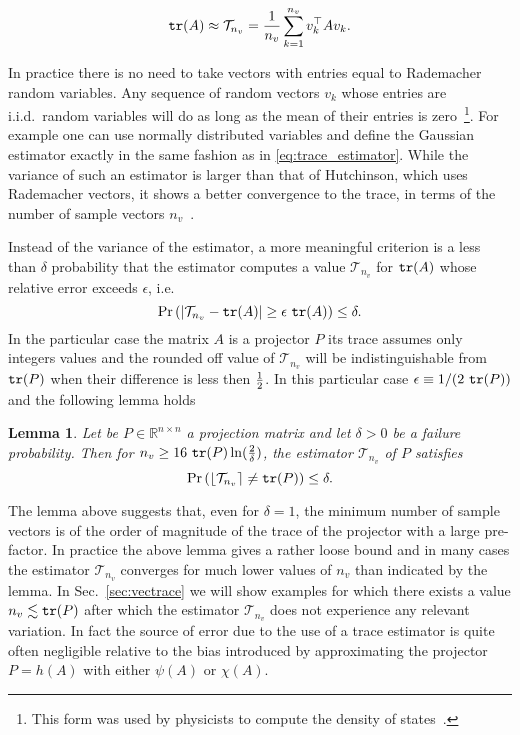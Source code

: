 \documentclass[12pt]{article}		\usepackage{tabls,multirow}
\def\TT{\mathcal{T}}
\def\trace{\mbox{\tt tr}}
\newtheorem{lemma}{Lemma}[section]
\begin{document}
\begin{equation}
\label{eq:trace_estimator}
\trace (A) \approx \TT_{n_v} =  {1 \over n_v}  \sum_{k=1}^{n_v} v_k^\top A v_k.
\end{equation}


In practice there is no need to take vectors with entries equal to
Rademacher random variables. Any sequence of random vectors $v_k$
whose entries are i.i.d.~random variables will do as long as the mean
of their entries is zero~\cite{Bekas-al-DIAGEST}\footnote{This form
  was used by physicists to compute the density of
  states~\cite{SilverRoederAl,Wang-DOS,Roder-al-96,SilverRoder1994}.}.
For example one can use normally distributed variables and define the
Gaussian estimator exactly in the same fashion as in
\eqref{eq:trace_estimator}. While the variance of such an estimator is
larger than that of Hutchinson, which uses Rademacher vectors, it
shows a better convergence to the trace, in terms of the number of
sample vectors $n_v$~\cite{Avron:2011hg}.

Instead of the variance of the estimator, a more meaningful criterion
is a less than $\delta$ probability that the estimator computes a
value $\TT_{n_v}$ for $\trace (A)$ whose relative error exceeds
$\epsilon$, i.e.
\begin{equation}
{\rm Pr}\left(|\TT_{n_v} - \trace(A)| \ge \epsilon \ \trace(A)\right) \le \delta.
\end{equation}
In the particular case the matrix $A$ is a projector $P$ its trace
assumes only integers values and the rounded off value of
$\TT_{n_v}$ will be indistinguishable from $\trace(P)$ when
their difference is less then ${1 \over 2}$. In this particular case
$\epsilon \equiv 1 / (2\ \trace(P))$ and the following lemma
holds~\cite{Avron:2011hg}
\begin{lemma}
\label{th:toledo}
Let be $P \in \mathbb{R}^{n \times n}$ a projection matrix and let $\delta > 0$ be a failure probability. Then for $n_v \ge 16 \ \trace(P) \ln ({2 \over \delta})$, the estimator $\TT_{n_v}$ of $P$ satisfies
\[
{\rm Pr}\left(\lfloor \TT_{n_v}\rceil \neq \trace(P)\right) \le \delta.
\]
\end{lemma}

The lemma above suggests that, even for $\delta = 1$, the minimum
number of sample vectors is of the order of magnitude of the trace of
the projector with a large pre-factor. In practice the above lemma
gives a rather loose bound and in many cases the estimator
$\TT_{n_v}$ converges for much lower values of $n_v$ than
indicated by the lemma. In Sec.~\ref{sec:vectrace} we will show
examples for which there exists a value $n_v \lesssim \trace(P)$ after which
the estimator $\TT_{n_v}$ does not experience any relevant
variation. In fact the source of error due to the use of a trace
estimator is quite often negligible relative to  the bias
introduced by approximating the projector $P = h(A)$ with either
$\psi(A)$ or $\chi(A)$.
\end{document}
